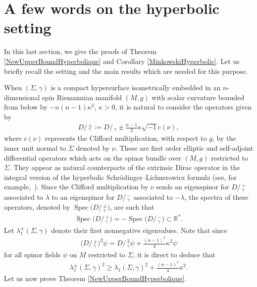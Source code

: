 \documentclass[pdftex]{sigma}
\numberwithin{equation}{section}
\def\D{D\!\!\!\!/\,}
\begin{document}
\section{A few words on the hyperbolic setting}\label{HyperbolicPart}

In this last section, we give the proofs of Theorem \ref{NewUpperBoundHyperbolique} and Corollary \ref{MinkowskiHyperbolic}. Let us briefly recall the setting and the main results which are needed for this purpose.

When $(\Sigma,\gamma)$ is a compact hypersurface isometrically embedded in an $n$-dimensional spin Riemannian manifold $(M,g)$ with scalar curvature bounded from below by $-n(n-1)\kappa^2$, $\kappa>0$, it is natural to consider the operators given by
\begin{gather*}
\D_\gamma^\pm:=\D_\gamma\pm \frac{n-1}{2}\kappa \sqrt{-1}c(\nu),
\end{gather*}
where $c(\nu)$ represents the Clifford multiplication, with respect to $g$, by the inner unit normal to $\Sigma$ denoted by $\nu$. These are first order elliptic and self-adjoint differential operators which acts on the spinor bundle over $(M,g)$ restricted to $\Sigma$. They appear as natural counterparts of the extrinsic Dirac operator in the integral version of the hyperbolic Schr\"odinger--Lichnerowicz formula (see, for example,~\cite{ChruscielHerzlich,HijaziMontielRaulot3,HijaziMontielRoldan,Kwong1,WangYau0}). Since the Clifford multiplication by $\nu$ sends an eigenspinor for $\D^+_\gamma$ associated to $\lambda$ to an eigenspinor for $\D^-_\gamma$ associated to $-\lambda$, the spectra of these operators, denoted by $\operatorname{Spec}\big(\D^\pm_\gamma\big)$, are such that
\begin{gather*}%
\operatorname{Spec}\big(\D_\gamma^+\big)=-\operatorname{Spec}\big(\D_\gamma^-\big)\subset\mathbb{R}^*.
\end{gather*}
Let $\lambda^\pm_1(\Sigma,\gamma)$ denote their first nonnegative eigenvalues. Note that since
\begin{gather*}
\big(\D_\gamma^\pm\big)^2\psi=\D_\gamma^2\psi+\frac{(n-1)^2}{4}\kappa^2\psi
\end{gather*}
for all spinor fields $\psi$ on $M$ restricted to $\Sigma$, it is direct to deduce that
\begin{gather}\label{SpectreDpm}
\lambda^\pm_1(\Sigma,\gamma)^2\geq \lambda_1(\Sigma,\gamma)^2+\frac{(n-1)^2}{4}\kappa^2.
\end{gather}
Let us now prove Theorem \ref{NewUpperBoundHyperbolique}.
\end{document}
